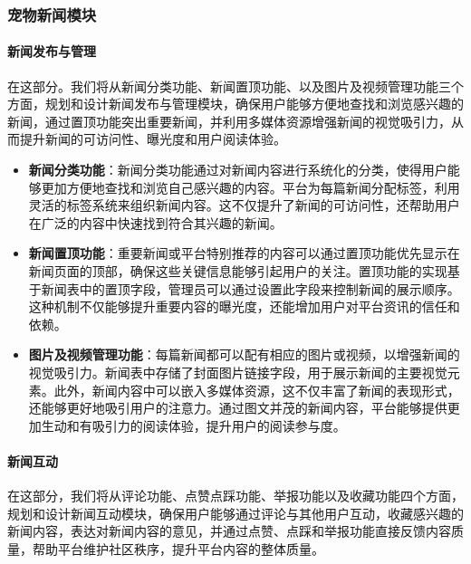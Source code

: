 \subsubsection{宠物新闻模块}

\paragraph{新闻发布与管理}

在这部分。我们将从新闻分类功能、新闻置顶功能、以及图片及视频管理功能三个方面，规划和设计新闻发布与管理模块，确保用户能够方便地查找和浏览感兴趣的新闻，通过置顶功能突出重要新闻，并利用多媒体资源增强新闻的视觉吸引力，从而提升新闻的可访问性、曝光度和用户阅读体验。

\begin{itemize}
	\item \textbf{新闻分类功能}：新闻分类功能通过对新闻内容进行系统化的分类，使得用户能够更加方便地查找和浏览自己感兴趣的内容。平台为每篇新闻分配标签，利用灵活的标签系统来组织新闻内容。这不仅提升了新闻的可访问性，还帮助用户在广泛的内容中快速找到符合其兴趣的新闻。
	\item \textbf{新闻置顶功能}：重要新闻或平台特别推荐的内容可以通过置顶功能优先显示在新闻页面的顶部，确保这些关键信息能够引起用户的关注。置顶功能的实现基于新闻表中的置顶字段，管理员可以通过设置此字段来控制新闻的展示顺序。这种机制不仅能够提升重要内容的曝光度，还能增加用户对平台资讯的信任和依赖。
	\item \textbf{图片及视频管理功能}：每篇新闻都可以配有相应的图片或视频，以增强新闻的视觉吸引力。新闻表中存储了封面图片链接字段，用于展示新闻的主要视觉元素。此外，新闻内容中可以嵌入多媒体资源，这不仅丰富了新闻的表现形式，还能够更好地吸引用户的注意力。通过图文并茂的新闻内容，平台能够提供更加生动和有吸引力的阅读体验，提升用户的阅读参与度。
\end{itemize}

\paragraph{新闻互动}

在这部分，我们将从评论功能、点赞点踩功能、举报功能以及收藏功能四个方面，规划和设计新闻互动模块，确保用户能够通过评论与其他用户互动，收藏感兴趣的新闻内容，表达对新闻内容的意见，并通过点赞、点踩和举报功能直接反馈内容质量，帮助平台维护社区秩序，提升平台内容的整体质量。


